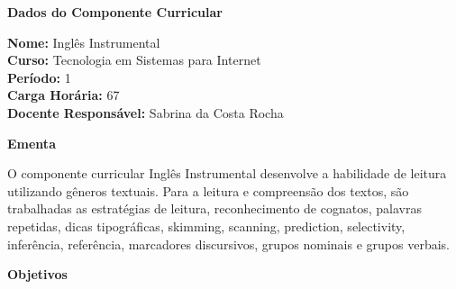 

\begin{snugshade}\begin{center}\textbf{
    Dados do Componente Curricular
}\end{center}\end{snugshade}

\noindent \textbf{Nome:}                Ingl\^es Instrumental
\\        \textbf{Curso:}               Tecnologia em Sistemas para Internet
\\        \textbf{Período:}             \unit{1}{\degree}
\\        \textbf{Carga Horária:}       \unit{67}{\hour}
\\        \textbf{Docente Responsável:} Sabrina da Costa Rocha


\begin{snugshade}\begin{center}\textbf{
    Ementa
\vphantom{q}}\end{center}\end{snugshade}

\noindent
O componente curricular Inglês Instrumental desenvolve a habilidade de leitura utilizando gêneros textuais. Para a leitura e compreensão dos textos, são trabalhadas as estratégias de leitura, reconhecimento de cognatos, palavras repetidas, dicas tipográficas, skimming, scanning, prediction, selectivity, inferência, referência, marcadores discursivos, grupos nominais e  grupos verbais.


\begin{snugshade}\begin{center}\textbf{
    Objetivos
}\end{center}\end{snugshade}

